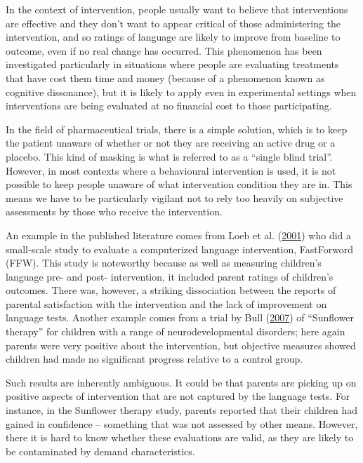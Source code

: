 \documentclass{krantz}
\begin{document}
In the context of intervention, people usually want to believe that interventions are effective and they don't want to appear critical of those administering the intervention, and so ratings of language are likely to improve from baseline to outcome, even if no real change has occurred. This phenomenon has been investigated particularly in situations where people are evaluating treatments that have cost them time and money (because of a phenomenon known as cognitive dissonance), but it is likely to apply even in experimental settings when interventions are being evaluated at no financial cost to those participating.

In the field of pharmaceutical trials, there is a simple solution, which is to keep the patient unaware of whether or not they are receiving an active drug or a placebo. This kind of masking is what is referred to as a ``single blind trial''. However, in most contexts where a behavioural intervention is used, it is not possible to keep people unaware of what intervention condition they are in. This means we have to be particularly vigilant not to rely too heavily on subjective assessments by those who receive the intervention.

An example in the published literature comes from Loeb et al. (\protect\hyperlink{ref-loeb2001}{2001}) who did a small-scale study to evaluate a computerized language intervention, FastForword (FFW). This study is noteworthy because as well as measuring children's language pre- and post- intervention, it included parent ratings of children's outcomes. There was, however, a striking dissociation between the reports of parental satisfaction with the intervention and the lack of improvement on language tests. Another example comes from a trial by Bull (\protect\hyperlink{ref-bull2007}{2007}) of ``Sunflower therapy'' for children with a range of neurodevelopmental disorders; here again parents were very positive about the intervention, but objective measures showed children had made no significant progress relative to a control group.

Such results are inherently ambiguous. It could be that parents are picking up on positive aspects of intervention that are not captured by the language tests. For instance, in the Sunflower therapy study, parents reported that their children had gained in confidence -- something that was not assessed by other means. However, there it is hard to know whether these evaluations are valid, as they are likely to be contaminated by demand characteristics.
\end{document}
